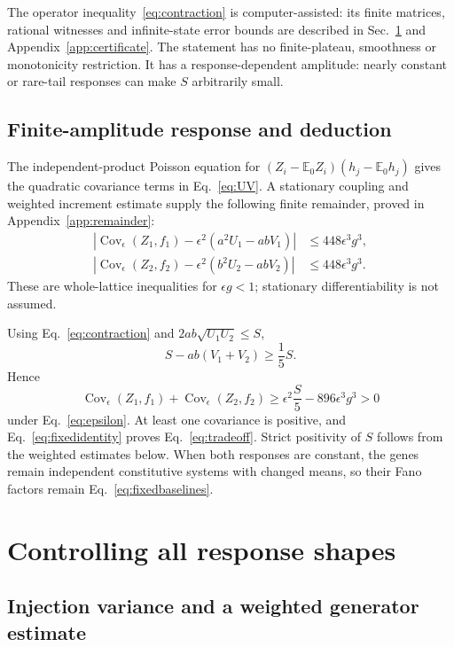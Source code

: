 \documentclass[11pt]{article}
\newcommand{\E}{\mathbb E}
\newcommand{\Cov}{\operatorname{Cov}}
\begin{document}
The operator inequality~\eqref{eq:contraction} is computer-assisted:
its finite matrices, rational witnesses and infinite-state error bounds
are described in Sec.~\ref{sec:contraction} and Appendix~\ref{app:certificate}.
The statement has no finite-plateau, smoothness or monotonicity restriction.
It has a response-dependent amplitude: nearly constant or rare-tail
responses can make $S$ arbitrarily small.

\subsection{Finite-amplitude response and deduction}

The independent-product Poisson equation for
$(Z_i-\E_0 Z_i)(h_j-\E_0 h_j)$ gives the quadratic covariance terms
in Eq.~\eqref{eq:UV}. A stationary coupling and weighted increment
estimate supply the following finite remainder, proved in
Appendix~\ref{app:remainder}:
\begin{align}
 \left|\Cov_\epsilon(Z_1,f_1)
       -\epsilon^2(a^2U_1-abV_1)\right|
 &\leq448\epsilon^3g^3,\nonumber\\
 \left|\Cov_\epsilon(Z_2,f_2)
       -\epsilon^2(b^2U_2-abV_2)\right|
 &\leq448\epsilon^3g^3 .
 \label{eq:remainder}
\end{align}
These are whole-lattice inequalities for $\epsilon g<1$; stationary
differentiability is not assumed.

Using Eq.~\eqref{eq:contraction} and
$2ab\sqrt{U_1U_2}\leq S$,
\begin{equation}
 S-ab(V_1+V_2)\geq\frac15S.
\end{equation}
Hence
\begin{equation}
 \Cov_\epsilon(Z_1,f_1)+\Cov_\epsilon(Z_2,f_2)
 \geq \epsilon^2\frac S5-896\epsilon^3g^3>0
\end{equation}
under Eq.~\eqref{eq:epsilon}. At least one covariance is positive, and
Eq.~\eqref{eq:fixedidentity} proves Eq.~\eqref{eq:tradeoff}.
Strict positivity of $S$ follows from the weighted estimates below.
When both responses are constant, the genes remain independent
constitutive systems with changed means, so their Fano factors remain
Eq.~\eqref{eq:fixedbaselines}.

\section{Controlling all response shapes}
\label{sec:contraction}

\subsection{Injection variance and a weighted generator estimate}
\end{document}
